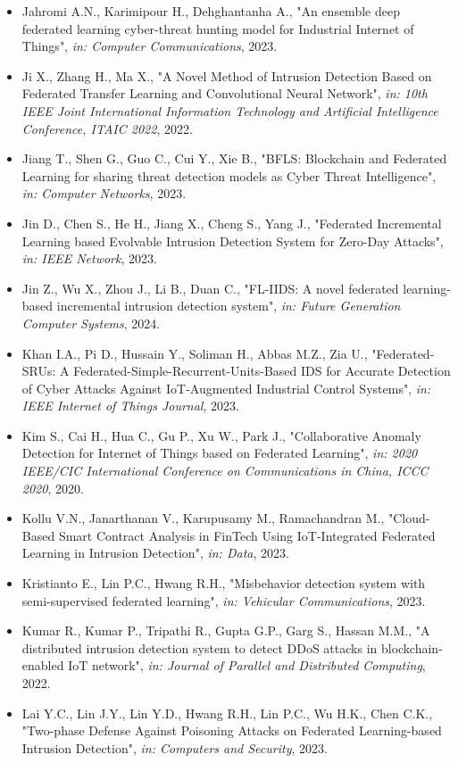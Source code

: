 \begin{itemize}
  \item Jahromi A.N., Karimipour H., Dehghantanha A., "An ensemble deep federated learning cyber-threat hunting model for Industrial Internet of Things", \textit{in: Computer Communications}, 2023.
  \item Ji X., Zhang H., Ma X., "A Novel Method of Intrusion Detection Based on Federated Transfer Learning and Convolutional Neural Network", \textit{in: 10th IEEE Joint International Information Technology and Artificial Intelligence Conference, ITAIC 2022}, 2022.
  \item Jiang T., Shen G., Guo C., Cui Y., Xie B., "BFLS: Blockchain and Federated Learning for sharing threat detection models as Cyber Threat Intelligence", \textit{in: Computer Networks}, 2023.
  \item Jin D., Chen S., He H., Jiang X., Cheng S., Yang J., "Federated Incremental Learning based Evolvable Intrusion Detection System for Zero-Day Attacks", \textit{in: IEEE Network}, 2023.
  \item Jin Z., Wu X., Zhou J., Li B., Duan C., "FL-IIDS: A novel federated learning-based incremental intrusion detection system", \textit{in: Future Generation Computer Systems}, 2024.
  \item Khan I.A., Pi D., Hussain Y., Soliman H., Abbas M.Z., Zia U., "Federated-SRUs: A Federated-Simple-Recurrent-Units-Based IDS for Accurate Detection of Cyber Attacks Against IoT-Augmented Industrial Control Systems", \textit{in: IEEE Internet of Things Journal}, 2023.
  \item Kim S., Cai H., Hua C., Gu P., Xu W., Park J., "Collaborative Anomaly Detection for Internet of Things based on Federated Learning", \textit{in: 2020 IEEE/CIC International Conference on Communications in China, ICCC 2020}, 2020.
  \item Kollu V.N., Janarthanan V., Karupusamy M., Ramachandran M., "Cloud-Based Smart Contract Analysis in FinTech Using IoT-Integrated Federated Learning in Intrusion Detection", \textit{in: Data}, 2023.
  \item Kristianto E., Lin P.C., Hwang R.H., "Misbehavior detection system with semi-supervised federated learning", \textit{in: Vehicular Communications}, 2023.
  \item Kumar R., Kumar P., Tripathi R., Gupta G.P., Garg S., Hassan M.M., "A distributed intrusion detection system to detect DDoS attacks in blockchain-enabled IoT network", \textit{in: Journal of Parallel and Distributed Computing}, 2022.
  \item Lai Y.C., Lin J.Y., Lin Y.D., Hwang R.H., Lin P.C., Wu H.K., Chen C.K., "Two-phase Defense Against Poisoning Attacks on Federated Learning-based Intrusion Detection", \textit{in: Computers and Security}, 2023.

\end{itemize}
